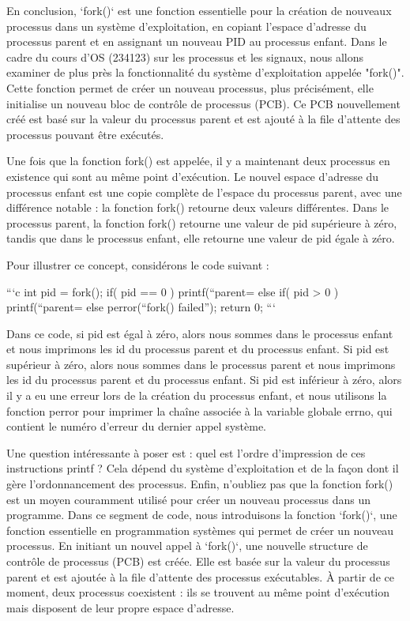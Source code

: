 \documentclass[12pt]{article}
\begin{document}
En conclusion, `fork()` est une fonction essentielle pour la création de nouveaux processus dans un système d'exploitation, en copiant l'espace d'adresse du processus parent et en assignant un nouveau PID au processus enfant.
Dans le cadre du cours d'OS (234123) sur les processus et les signaux, nous allons examiner de plus près la fonctionnalité du système d'exploitation appelée "fork()". Cette fonction permet de créer un nouveau processus, plus précisément, elle initialise un nouveau bloc de contrôle de processus (PCB). Ce PCB nouvellement créé est basé sur la valeur du processus parent et est ajouté à la file d'attente des processus pouvant être exécutés.

Une fois que la fonction fork() est appelée, il y a maintenant deux processus en existence qui sont au même point d'exécution. Le nouvel espace d'adresse du processus enfant est une copie complète de l'espace du processus parent, avec une différence notable : la fonction fork() retourne deux valeurs différentes. Dans le processus parent, la fonction fork() retourne une valeur de pid supérieure à zéro, tandis que dans le processus enfant, elle retourne une valeur de pid égale à zéro.

Pour illustrer ce concept, considérons le code suivant :

```c
int pid = fork();
if( pid == 0 ) {
   printf(“parent=%
} else if( pid > 0 ) {
   printf(“parent=%
} else {
   perror(“fork() failed”);
}
return 0;
```

Dans ce code, si pid est égal à zéro, alors nous sommes dans le processus enfant et nous imprimons les id du processus parent et du processus enfant. Si pid est supérieur à zéro, alors nous sommes dans le processus parent et nous imprimons les id du processus parent et du processus enfant. Si pid est inférieur à zéro, alors il y a eu une erreur lors de la création du processus enfant, et nous utilisons la fonction perror pour imprimer la chaîne associée à la variable globale errno, qui contient le numéro d'erreur du dernier appel système.

Une question intéressante à poser est : quel est l'ordre d'impression de ces instructions printf ? Cela dépend du système d'exploitation et de la façon dont il gère l'ordonnancement des processus. Enfin, n'oubliez pas que la fonction fork() est un moyen couramment utilisé pour créer un nouveau processus dans un programme.
Dans ce segment de code, nous introduisons la fonction `fork()`, une fonction essentielle en programmation systèmes qui permet de créer un nouveau processus. En initiant un nouvel appel à `fork()`, une nouvelle structure de contrôle de processus (PCB) est créée. Elle est basée sur la valeur du processus parent et est ajoutée à la file d'attente des processus exécutables. À partir de ce moment, deux processus coexistent : ils se trouvent au même point d'exécution mais disposent de leur propre espace d'adresse.
\end{document}
